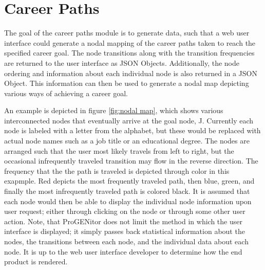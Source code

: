 \section{Career Paths}
\label{sect:career-paths}
The goal of the career paths module is to generate data, such that a web user
interface could generate a nodal mapping of the career paths taken to reach the
specified career goal.  The node transitions along with the transition
frequencies are returned to the user interface as JSON Objects.  Additionally,
the node ordering and information about each individual node is also returned in
a JSON Object.  This information can then be used to generate a nodal map
depicting various ways of achieving a career goal.  

An example is depicted in figure \ref{fig:nodal map}, which shows various
interconnected nodes that eventually arrive at the goal node, J.  Currently each
node is labeled with a letter from the alphabet, but these would be replaced
with actual node names such as a job title or an educational degree.  The nodes
are arranged such that the user most likely travels from left to right, but the
occasional infrequently traveled transition may flow in the reverse direction. 
The frequency that the the path is traveled is depicted through color in this
exapmple.  Red depicts the most frequently traveled path, then blue, green, and
finally the most infrequently traveled path is colored black.  It is assumed
that each node would then be able to display the individual node information
upon user request; either through clicking on the node or through some other
user action.  Note, that ProGENitor does not limit the method in which the user
interface is displayed; it simply passes back statistical information about
the nodes, the transitions between each node, and the individual data about each
node.  It is up to the web user interface developer to determine how the end
product is rendered.


\usetikzlibrary{shapes,arrows,chains}


